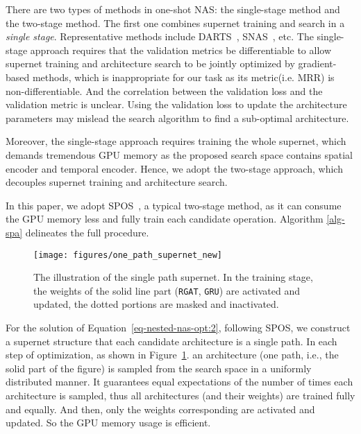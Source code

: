 \documentclass[11pt]{article}
\begin{document}
There are two types of methods in one-shot NAS: 
the single-stage method and the two-stage method.
The first one combines supernet training and search in a \emph{single stage}.
Representative methods include DARTS~\citep{liu2019darts}, SNAS~\citep{xie2019snas}, etc.
The single-stage approach requires that the validation metrics be differentiable 
to allow supernet training and architecture search to be jointly optimized by gradient-based methods,
which is inappropriate for our task as its metric(i.e. MRR) is non-differentiable. 
And the correlation between the validation loss and the validation metric is unclear.
Using the validation loss to update the architecture parameters may mislead the search algorithm to find a sub-optimal architecture.

Moreover, 
the single-stage approach requires training the whole supernet, 
which demands tremendous GPU memory as the proposed search space contains spatial encoder and temporal encoder. 
Hence,
we adopt the two-stage approach,
which decouples supernet training and architecture search.
 
In this paper, 
we adopt SPOS~\citep{guo2020single},
a typical two-stage method,
as it can consume the GPU memory less and fully train each candidate operation.
Algorithm \ref{alg-spa} delineates the full procedure. 

\begin{figure}[t]
	\centering
	\texttt{[image: figures/one\_path\_supernet\_new]}
	\caption{The illustration of the single path supernet.
		In the training stage, 
		the weights of the solid line part (\texttt{RGAT}, \texttt{GRU}) are activated and updated, the dotted portions are masked and inactivated.}
	\label{fig-search_algorithm}
	\vspace{-10px}
\end{figure}

 For the solution of Equation~\eqref{eq-nested-nas-opt:2}, 
following SPOS,
we construct a supernet structure 
that each candidate architecture is a single path.
In each step of optimization, 
as shown in Figure~\ref{fig-search_algorithm}.
an architecture  (one path, i.e., the solid part of the figure) is sampled from the search space 
in a uniformly distributed manner.
It guarantees equal expectations of the number of times each architecture is sampled, 
thus all architectures (and their weights) are trained fully and equally.
And then, 
only the weights corresponding  are activated and updated.
So the GPU memory usage is efficient. 
\end{document}
